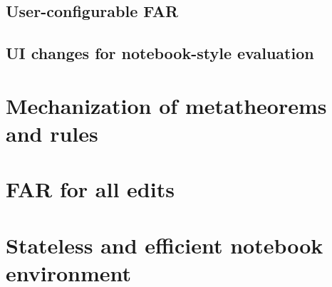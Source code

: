 \subsection{User-configurable FAR}
\label{sec:far-improv-user-config}




\subsection{UI changes for notebook-style evaluation}
\label{sec:far-improv-notebook-ui}



\section{Mechanization of metatheorems and rules}
\label{sec:formalization}

\section{FAR for all edits}
\label{sec:far_all_edits}


\section{Stateless and efficient notebook environment}
\label{sec:notebook_ui_future}


